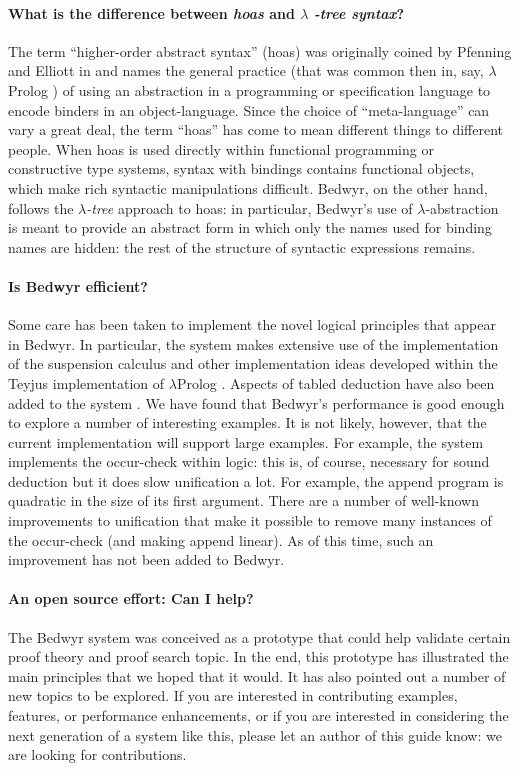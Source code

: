 \documentclass{article}
\newcommand{\lp}{$\lambda$Prolog}
\begin{document}
\paragraph{What is the difference between {\em hoas} and $\lambda${\em
    -tree syntax}?}
The term ``higher-order abstract syntax'' (hoas) was originally coined
by Pfenning and Elliott in \cite{pfenning88pldi} and names the general
practice (that was common then in, say, \lp{}
\cite{miller87slp}) of using an abstraction in a programming or
specification language to encode binders in an object-language.  Since
the choice of ``meta-language'' can vary a great deal, the term
``hoas'' has come to mean different things to different people.  When
hoas is used directly within functional programming or constructive
type systems, syntax with bindings contains functional objects, which
make rich syntactic manipulations difficult.  Bedwyr, on the other
hand, follows the {\em $\lambda$-tree} approach \cite{miller00cl} to
hoas: in particular, Bedwyr's use of $\lambda$-abstraction is meant to
provide an abstract form in which only the names used for binding
names are hidden: the rest of the structure of syntactic expressions
remains.

\paragraph{Is Bedwyr efficient?}
Some care has been taken to implement the novel logical principles
that appear in Bedwyr.  In particular, the system makes extensive use
of the implementation of the suspension calculus \cite{nadathur99jflp}
and other implementation ideas developed within the Teyjus
\cite{nadathur99cade} implementation of \lp{} \cite{nadathur88iclp}.
Aspects of tabled deduction have also been added to the system
\cite{ramakrishna97cav,pientka05cade}.  We have found that Bedwyr's
performance is good enough to explore a number of interesting
examples.  It is not likely, however, that the current implementation
will support large examples.  For example, the system implements the
occur-check within logic: this is, of course, necessary for sound
deduction but it does slow unification a lot.  For example, the append
program is quadratic in the size of its first argument.  There are a
number of well-known improvements to unification that make it possible
to remove many instances of the occur-check (and making append
linear).  As of this time, such an improvement has not been added to
Bedwyr.

\paragraph{An open source effort: Can I help?}
The Bedwyr system was conceived as a prototype that could help
validate certain proof theory and proof search topic.  In the end,
this prototype has illustrated the main principles that we hoped that
it would.  It has also pointed out a number of new topics to be
explored.  If you are interested in contributing examples, features,
or performance enhancements, or if you are interested in considering
the next generation of a system like this, please let an author of
this guide know: we are looking for contributions.
\end{document}
